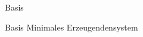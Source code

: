 \documentclass[class=article, crop=false]{standalone}
\begin{document}
\begin{zettel}{Basis}
\begin{flashcard}[o4hbik8w]{Basis}
	Minimales Erzeugendensystem

\end{flashcard}

\end{zettel}
\end{document}
